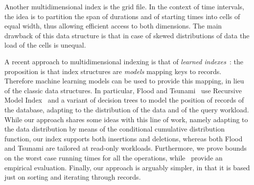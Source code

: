 \documentclass[sigconf,nonacm,anonymous]{acmart}
\theoremstyle{definition}
\newcommand{\jg}[1]{\textcolor{brown}{(*** JG: #1 ***)}}
\newcommand{\mc}[1]{\textcolor{teal}{(*** MC: #1 ***)}}
\begin{document}
Another multidimensional index is the grid file\cite{DBLP:journals/tods/NievergeltHS84}. In the context of time intervals, the idea is to partition the span of durations and of starting times into cells of equal width, thus allowing efficient access to both dimensions. The main drawback of this data structure is that in case of skewed distributions of data the load of the cells is unequal.

A recent approach to multidimensional indexing is that of \emph{learned
indexes}~\cite{DBLP:conf/sigmod/KraskaBCDP18}: the proposition is that index
structures are \emph{models} mapping keys to records. Therefore machine
learning models can be used to provide this mapping, in lieu of the classic
data structures. In particular, Flood and
Tsunami~\cite{DBLP:conf/sigmod/NathanDAK20,
DBLP:journals/corr/abs-2006-13282} use Recursive Model
Index~\cite{DBLP:conf/sigmod/KraskaBCDP18} and a variant of decision trees to
model the position of records of the database, adapting to the distribution
of the data and of the query workload.
%
While our
approach shares some ideas with this line of work, namely adapting to
the data distribution by means of the conditional cumulative
distribution function, our index supports both insertions and
deletions, whereas both Flood and Tsunami are tailored at read-only
workloads.  Furthermore, we prove bounds on the worst case running
times for all the operations,
while~\cite{DBLP:conf/sigmod/NathanDAK20,
  DBLP:journals/corr/abs-2006-13282} provide an empirical evaluation.
Finally, our approach is arguably simpler, in that it is based just on sorting and iterating through records.
\end{document}
